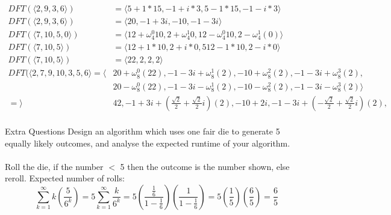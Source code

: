 \documentclass[a4paper]{article}
\begin{document}
\begin{enumerate}
\begin{align*}
						DFT(\langle 2, 9, 3, 6 \rangle ) & = \langle 5 + 1 * 15, -1 + i * 3,  5 - 1 * 15, -1 - i * 3 \rangle \\
						DFT(\langle 2, 9, 3, 6 \rangle ) & = \langle 20, -1 + 3i,  -10, -1 - 3i \rangle \\
						DFT(\langle 7, 10, 5, 0 \rangle ) & = \langle 12 + \omega_4^0 10, 2 + \omega_4^1 0,  12 - \omega_4^0 10, 2 - \omega_4^1 (0) \rangle \\
						DFT(\langle 7, 10, 5 \rangle ) & = \langle 12 + 1 * 10,  2 + i * 0,  512- 1 * 10, 2 - i * 0 \rangle \\
						DFT(\langle 7, 10, 5 \rangle ) & = \langle 22, 2, 2, 2 \rangle \\
						DFT(\langle 2, 7, 9, 10, 3, 5, 6 \rangle = \langle& 20 + \omega_8^0 (22), -1-3i + \omega_8^1 (2), -10 + \omega_8^2 (2), -1-3i + \omega_8^3 (2), \\
						& 20 - \omega_8^0 (22), -1-3i - \omega_8^1 (2), -10 - \omega_8^2 (2), -1-3i - \omega_8^3 (2) \rangle \\
						= \rangle& 42, -1 + 3i + (\frac{\sqrt{2}}{2} + \frac{\sqrt{2}}{2}i)(2), -10 + 2i, -1 - 3i + (-\frac{\sqrt{2}}{2} + \frac{\sqrt{2}}{2}i)(2), \\
				\end{align*}
\end{enumerate}

Extra Questions
Design an algorithm which uses one fair die to generate 5 equally likely outcomes, and analyse the expected runtime of your algorithm. \\ \\
Roll the die, if the number $<$ 5 then the outcome is the number shown, else reroll. Expected number of rolls:
$$ \sum_{k=1}^{\infty} k(\frac{5}{6^k}) = 5\sum_{k=1}^{\infty} \frac{k}{6^k} = 5(\frac{\frac{1}{6}}{1-\frac{1}{6}})(\frac{1}{1-\frac{1}{6}}) = 5(\frac{1}{5})(\frac{6}{5}) = \frac{6}{5}   $$
\end{document}
